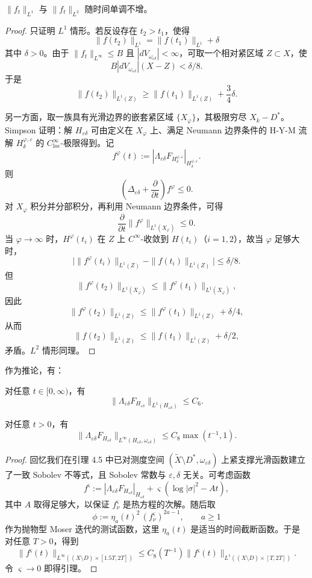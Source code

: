 \begin{lemma}
\(\|f_t\|_{L^1}\) 与 \(\|f_t\|_{L^2}\) 随时间单调不增。
\end{lemma}

\begin{proof}
只证明 \(L^1\) 情形。若反设存在 \(t_2>t_1\)，使得
\[
\|f(t_2)\|_{L^1}=\|f(t_1)\|_{L^1}+\delta
\]
其中 \(\delta>0\)。由于 \(\|f_t\|_{L^\infty}\le B\) 且 \(|dV_{\omega_{\varepsilon\delta}}|<\infty\)，可取一个相对紧区域 \(Z\subset X\)，使
\[
B|dV_{\omega_{\varepsilon\delta}}|(X-Z)<\delta/8.
\]
于是
\[
\|f(t_2)\|_{L^1(Z)}\ge \|f(t_1)\|_{L^1(Z)}+\frac34\delta.
\]

另一方面，取一族具有光滑边界的嵌套紧区域 \(\{X_\varphi\}\)，其极限穷尽 \(X_k-D^*\)。Simpson \cite[Section 6]{Si1} 证明：解 \(H_{\varepsilon\delta}\) 可由定义在 \(X_\varphi\) 上、满足 Neumann 边界条件的 H-Y-M 流解 \(H^{\varphi,\varepsilon}_\delta\) 的 \(C^\infty_{\mathrm{loc}}\)-极限得到。记
\[
f^\varphi(t):=
|\Lambda_{\varepsilon\delta} F_{H^{\varphi,\varepsilon}_\delta}|_{H^{\varphi,\varepsilon}_\delta}.
\]
则
\[
\left(\Delta_{\varepsilon\delta}+\frac{\partial}{\partial t}\right)f^\varphi\le 0.
\]
对 \(X_\varphi\) 积分并分部积分，再利用 Neumann 边界条件，可得
\[
\frac{\partial}{\partial t}\|f^\varphi\|_{L^1(X_\varphi)}\le 0.
\]
当 \(\varphi\to\infty\) 时，\(H^\varphi(t_i)\) 在 \(Z\) 上 \(C^\infty\)-收敛到 \(H(t_i)\)（\(i=1,2\)），故当 \(\varphi\) 足够大时，
\[
\bigl|\|f^\varphi(t_i)\|_{L^1(Z)}-\|f(t_i)\|_{L^1(Z)}\bigr|\le \delta/8.
\]
但
\[
\|f^\varphi(t_2)\|_{L^1(X_\varphi)}\le \|f^\varphi(t_1)\|_{L^1(X_\varphi)},
\]
因此
\[
\|f^\varphi(t_2)\|_{L^1(Z)}\le \|f^\varphi(t_1)\|_{L^1(Z)}+\delta/4,
\]
从而
\[
\|f(t_2)\|_{L^1(Z)}\le \|f(t_1)\|_{L^1(Z)}+\delta/2,
\]
矛盾。\(L^2\) 情形同理。
\end{proof}

作为推论，有：

\begin{lemma}
对任意 \(t\in [0,\infty)\)，有
\[
\|\Lambda_{\varepsilon\delta} F_{H_{\varepsilon\delta}}\|_{L^1(H_{\varepsilon\delta})}\le C_6.
\]
\end{lemma}

\begin{lemma}
对任意 \(t>0\)，有
\[
\|\Lambda_{\varepsilon\delta} F_{H_{\varepsilon\delta}}\|_{L^\infty(H_{\varepsilon\delta},\omega_{\varepsilon\delta})}
\le
C_8\max(t^{-1},1).
\]
\end{lemma}

\begin{proof}
回忆我们在引理 4.5 中已对测度空间 \((\widetilde X\setminus D^*,\omega_{\varepsilon\delta})\) 上紧支撑光滑函数建立了一致 Sobolev 不等式，且 Sobolev 常数与 \(\varepsilon,\delta\) 无关。可考虑函数
\[
f^\varsigma:=|\Lambda_{\varepsilon\delta} F_{H_{\varepsilon\delta}}|_{H_{\varepsilon\delta}}
+\varsigma(\log|\sigma|^2-At),
\]
其中 \(A\) 取得足够大，以保证 \(f^\varsigma_\nu\) 是热方程的次解。随后取
\[
\phi:=\eta_a(t)^2\,(f^\varsigma_\nu)^{2a-1},\qquad a\ge 1
\]
作为抛物型 Moser 迭代的测试函数，这里 \(\eta_a(t)\) 是适当的时间截断函数。于是对任意 \(T>0\)，得到
\[
\|f^\varsigma(t)\|_{L^\infty((X\setminus D)\times [1.5T,2T])}
\le
C_8(T^{-1})
\|f^\varsigma(t)\|_{L^1((X\setminus D)\times [T,2T])}.
\]
令 \(\varsigma\to 0\) 即得引理。
\end{proof}

